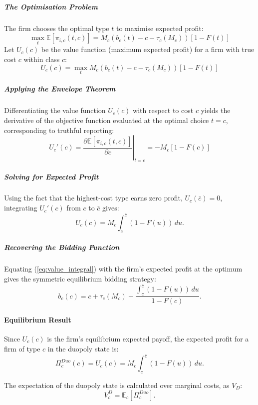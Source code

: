 \documentclass[12pt]{article}
\begin{document}
\subparagraph{The Optimisation Problem}
The firm chooses the optimal type $t$ to maximise expected profit:
\begin{equation}
    \max_{t} \mathbb{E}[\pi_{i,c}(t, c)] = M_c(b_c(t) - c - \tau_c(M_c))[1 - F(t)]
\end{equation}
Let $U_c(c)$ be the value function (maximum expected profit) for a firm with true cost $c$ within class $c$:
\begin{equation}
    U_c(c) = \max_{t} M_c(b_c(t) - c - \tau_c(M_c))[1 - F(t)]
\end{equation}

\subparagraph{Applying the Envelope Theorem}
Differentiating the value function $U_c(c)$ with respect to cost $c$ yields the derivative of the objective function evaluated at the optimal choice $t=c$, corresponding to truthful reporting:
\begin{equation}
    U_c'(c) = \left. \frac{\partial \mathbb{E}[\pi_{i,c}(t, c)]}{\partial c} \right|_{t=c} = -M_c[1 - F(c)]
\end{equation}

\subparagraph{Solving for Expected Profit}
Using the fact that the highest-cost type earns zero profit, $U_c(\bar{c}) = 0$, integrating $U_c'(c)$ from $c$ to $\bar{c}$ gives:
\begin{equation} \label{eq:value_integral}
    U_c(c) = M_c \int_{c}^{\bar{c}} (1 - F(u)) \, du .
\end{equation}

\subparagraph{Recovering the Bidding Function}
Equating (\ref{eq:value_integral}) with the firm's expected profit at the optimum gives the symmetric equilibrium bidding strategy:
\begin{equation} \label{eq:bid_function}
    b_c(c) = c + \tau_c(M_c) + \frac{\int_{c}^{\bar{c}} (1 - F(u)) \, du}{1 - F(c)} .
\end{equation}

\paragraph{Equilibrium Result}
Since $U_c(c)$ is the firm's equilibrium expected payoff, the expected profit for a firm of type $c$ in the duopoly state is:
\begin{equation} \label{eq:duo_profit}
    \Pi_c^{Duo}(c) = U_c(c)
    = M_c \int_{c}^{\bar{c}} (1 - F(u)) \, du .
\end{equation}

The expectation of the duopoly state is calculated over marginal costs, as $V_D$:
\begin{equation}
V_c^D = \mathbb{E}_c[\Pi_c^{Duo}] .
\end{equation}
\end{document}
